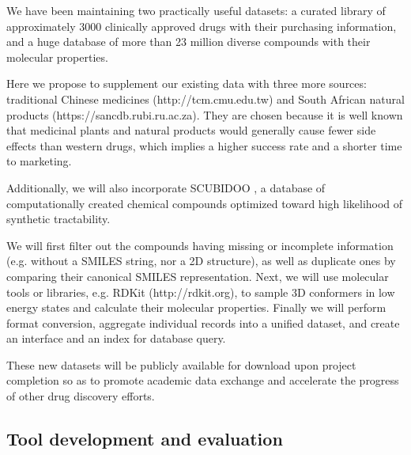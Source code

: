 \documentclass[a4paper,12pt]{article}
\begin{document}
We have been maintaining two practically useful datasets: a curated library of approximately 3000 clinically approved drugs with their purchasing information, and a huge database of more than 23 million diverse compounds with their molecular properties.

Here we propose to supplement our existing data with three more sources: traditional Chinese medicines \citep{528} (http://tcm.cmu.edu.tw) and South African natural products \citep{1680} (https://sancdb.rubi.ru.ac.za). They are chosen because it is well known that medicinal plants and natural products would generally cause fewer side effects than western drugs, which implies a higher success rate and a shorter time to marketing.

Additionally, we will also incorporate SCUBIDOO \citep{1682}, a database of computationally created chemical compounds optimized toward high likelihood of synthetic tractability. 

We will first filter out the compounds having missing or incomplete information (e.g. without a SMILES string, nor a 2D structure), as well as duplicate ones by comparing their canonical SMILES representation. Next, we will use molecular tools or libraries, e.g. RDKit (http://rdkit.org), to sample 3D conformers in low energy states and calculate their molecular properties. Finally we will perform format conversion, aggregate individual records into a unified dataset, and create an interface and an index for database query. %

These new datasets will be publicly available for download upon project completion so as to promote academic data exchange and accelerate the progress of other drug discovery efforts.

\subsection*{Tool development and evaluation}

\end{document}
